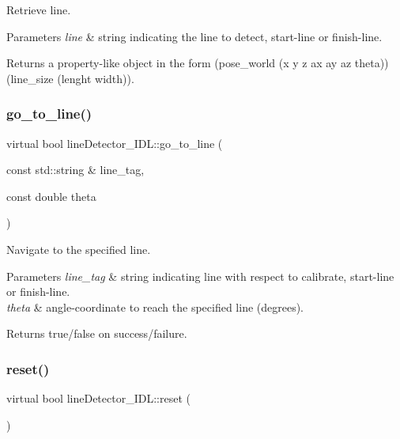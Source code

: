 Retrieve line. 


\begin{DoxyParams}{Parameters}
{\em line} & string indicating the line to detect, start-\/line or finish-\/line. \\
\hline
\end{DoxyParams}
\begin{DoxyReturn}{Returns}
a property-\/like object in the form (pose\+\_\+world (x y z ax ay az theta)) (line\+\_\+size (lenght width)). 
\end{DoxyReturn}
\mbox{\label{classlineDetector__IDL_af8af05e2ad1ad143c42d5229242bc7f3}} 
\subsubsection{\texorpdfstring{go\_to\_line()}{go\_to\_line()}}
{\footnotesize\ttfamily virtual bool line\+Detector\+\_\+\+I\+D\+L\+::go\+\_\+to\+\_\+line (\begin{DoxyParamCaption}\item[{const std\+::string \&}]{line\+\_\+tag,  }\item[{const double}]{theta }\end{DoxyParamCaption})\hspace{0.3cm}{\ttfamily [virtual]}}



Navigate to the specified line. 


\begin{DoxyParams}{Parameters}
{\em line\+\_\+tag} & string indicating line with respect to calibrate, start-\/line or finish-\/line. \\
\hline
{\em theta} & angle-\/coordinate to reach the specified line (degrees). \\
\hline
\end{DoxyParams}
\begin{DoxyReturn}{Returns}
true/false on success/failure. 
\end{DoxyReturn}
\mbox{\label{classlineDetector__IDL_a665153eb57fa761fe6dd9ae741169f7b}} 
\subsubsection{\texorpdfstring{reset()}{reset()}}
{\footnotesize\ttfamily virtual bool line\+Detector\+\_\+\+I\+D\+L\+::reset (\begin{DoxyParamCaption}{ }\end{DoxyParamCaption})\hspace{0.3cm}{\ttfamily [virtual]}}



